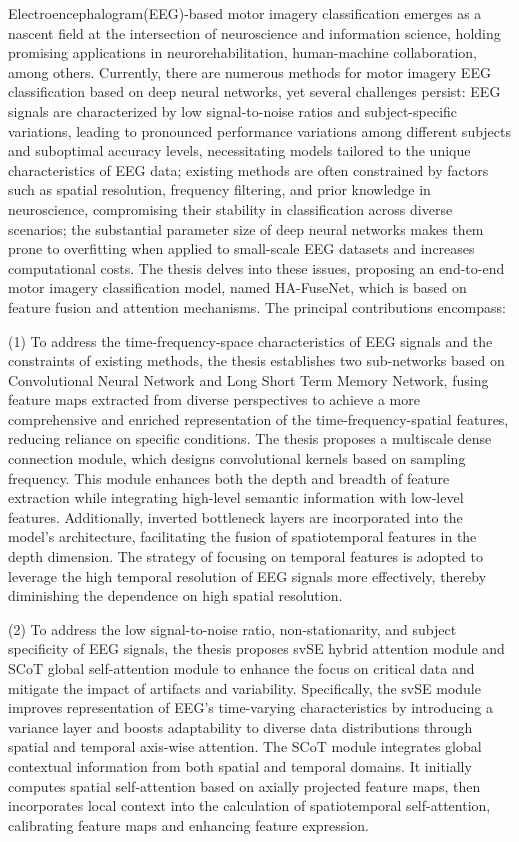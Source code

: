 
Electroencephalogram(EEG)-based motor imagery classification emerges as a nascent field at the intersection of neuroscience and information science, holding promising applications in neurorehabilitation, human-machine collaboration, among others.  Currently, there are numerous methods for motor imagery EEG classification based on deep neural networks, yet several challenges persist: EEG signals are characterized by low signal-to-noise ratios and subject-specific variations, leading to pronounced performance variations among different subjects and suboptimal accuracy levels, necessitating models tailored to the unique characteristics of EEG data; existing methods are often constrained by factors such as spatial resolution, frequency filtering, and prior knowledge in neuroscience, compromising their stability in classification across diverse scenarios; the substantial parameter size of deep neural networks makes them prone to overfitting  when applied to small-scale EEG datasets and increases computational costs. The thesis delves into these issues, proposing an end-to-end motor imagery classification model,  named HA-FuseNet, which is based on feature fusion and attention mechanisms. The principal contributions encompass:

(1) To address the time-frequency-space characteristics of EEG signals and the constraints of existing methods, the thesis establishes two sub-networks based on Convolutional Neural Network and Long Short Term Memory Network, fusing feature maps extracted from diverse perspectives to achieve a more comprehensive and enriched representation of the time-frequency-spatial features, reducing reliance on specific conditions. The thesis proposes a multiscale dense connection module, which designs convolutional kernels based on sampling frequency. This module enhances both the depth and breadth of feature extraction while integrating high-level semantic information with low-level features. Additionally, inverted bottleneck layers are incorporated into the model's architecture, facilitating the fusion of spatiotemporal features in the depth dimension. The strategy of focusing on temporal features is adopted to leverage the high temporal resolution of EEG signals more effectively, thereby diminishing the dependence on high spatial resolution.

(2) To address the low signal-to-noise ratio, non-stationarity, and subject specificity of EEG signals, the thesis proposes svSE hybrid attention module and SCoT global self-attention module to enhance the focus on critical data and mitigate the impact of artifacts and variability. Specifically, the svSE module improves representation of EEG's time-varying characteristics by introducing a variance layer and boosts adaptability to diverse data distributions through spatial and temporal axis-wise attention. The SCoT module integrates global contextual information from both spatial and temporal domains. It initially computes spatial self-attention based on axially projected feature maps, then incorporates local context into the calculation of spatiotemporal self-attention, calibrating feature maps and enhancing feature expression.

